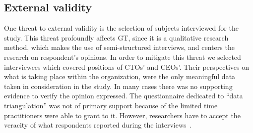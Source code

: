 \documentclass[10pt,journal,letterpaper,compsoc]{IEEEtran}
\begin{document}

\subsection{External validity}

One threat to external validity is the selection of subjects interviewed for
the study. This threat profoundly affects GT, since it is a qualitative
research method, which makes the use of semi-structured interviews, and centers
the research on respondent's opinions. In order to mitigate this threat we
selected interviewees which covered positions of CTOs' and CEOs'. Their
perspectives on what is taking place within the organization, were the only
meaningful data taken in consideration in the study. In many cases there was
no supporting evidence to verify the opinion expressed. The questionnaire
dedicated to ``data triangulation'' was not of primary support because of the
limited time practitioners were able to grant to it. However, researchers have
to accept the veracity of what respondents reported during the 
interviews~\cite{Coleman2008a}.  %
\end{document}
